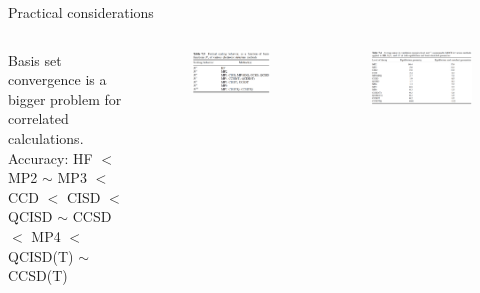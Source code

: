 \documentclass[aspectratio=169]{beamer}
\begin{document}
\begin{frame}{Practical considerations}
\begin{columns}
Basis set convergence is a bigger problem for correlated calculations.\newline
\newline
Accuracy: HF $<$ MP2 $\sim$ MP3 $<$ CCD $<$ CISD $<$ QCISD $\sim$ CCSD $<$ MP4 $<$ QCISD(T) $\sim$ CCSD(T)\cite{foresmanExploringChemistryElectronic1996}
    \begin{figure}
        \centering
        \includegraphics[width=0.9\linewidth]{lectures/figures/3_scaling.png}
    \end{figure}
    \begin{figure}
        \centering
        \includegraphics[width=\linewidth]{lectures/figures/3_correlation_energies_vs_FCI.png}
    \end{figure}
\end{columns}

\end{frame}
\end{document}
